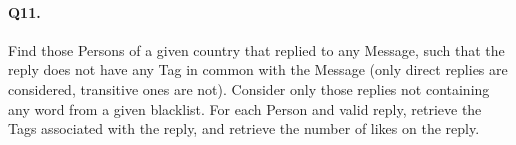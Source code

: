 \paragraph{Q11.}

Find those Persons of a given country that replied to any Message, such
that the reply does not have any Tag in common with the Message (only
direct replies are considered, transitive ones are not). Consider only
those replies not containing any word from a given blacklist. For each
Person and valid reply, retrieve the Tags associated with the reply, and
retrieve the number of likes on the reply.
